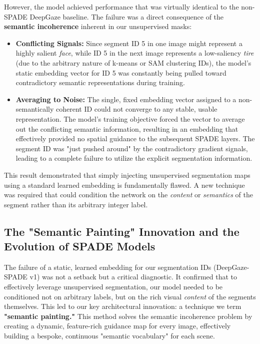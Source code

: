 However, the model achieved performance that was virtually identical to the non-SPADE DeepGaze baseline. The failure was a direct consequence of the \textbf{semantic incoherence} inherent in our unsupervised masks:

\begin{itemize}
    \item \textbf{Conflicting Signals:} Since segment ID 5 in one image might represent a highly salient \textit{face}, while ID 5 in the next image represents a low-saliency \textit{tire} (due to the arbitrary nature of k-means or SAM clustering IDs), the model's static embedding vector for ID 5 was constantly being pulled toward contradictory semantic representations during training.
    \item \textbf{Averaging to Noise:} The single, fixed embedding vector assigned to a non-semantically coherent ID could not converge to any stable, usable representation. The model's training objective forced the vector to average out the conflicting semantic information, resulting in an embedding that effectively provided no spatial guidance to the subsequent SPADE layers. The segment ID was "just pushed around" by the contradictory gradient signals, leading to a complete failure to utilize the explicit segmentation information.
\end{itemize}

This result demonstrated that simply injecting unsupervised segmentation maps using a standard learned embedding is fundamentally flawed. A new technique was required that could condition the network on the \textit{content} or \textit{semantics} of the segment rather than its arbitrary integer label.

\subsection{The "Semantic Painting" Innovation and the Evolution of SPADE Models}
\label{sec:method_semantic_painting}

The failure of a static, learned embedding for our segmentation IDs (DeepGaze-SPADE v1) was not a setback but a critical diagnostic. It confirmed that to effectively leverage unsupervised segmentation, our model needed to be conditioned not on arbitrary labels, but on the rich visual \textit{content} of the segments themselves. This led to our key architectural innovation: a technique we term \textbf{"semantic painting."} This method solves the semantic incoherence problem by creating a dynamic, feature-rich guidance map for every image, effectively building a bespoke, continuous "semantic vocabulary" for each scene.

